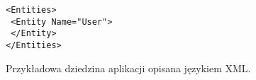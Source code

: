 \begin{figure}[!ht]
\begin{verbatim}
<Entities>
 <Entity Name="User">
 </Entity>
</Entities>
\end{verbatim}

\caption{Przykładowa dziedzina aplikacji opisana językiem XML.}
\label{fig:implementation_core:xml}
\end{figure}
